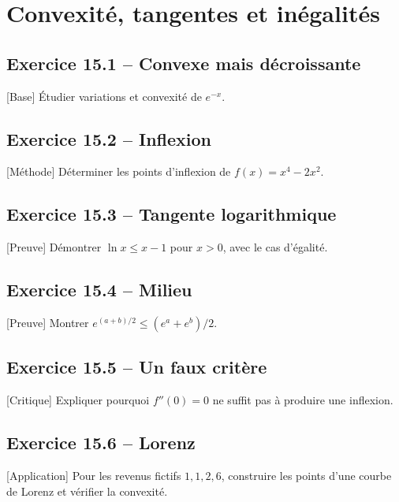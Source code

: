 \chapter{Convexité, tangentes et inégalités}
\section*{Exercice 15.1 -- Convexe mais décroissante}
[Base] Étudier variations et convexité de $e^{-x}$.

\section*{Exercice 15.2 -- Inflexion}
[Méthode] Déterminer les points d'inflexion de $f(x)=x^4-2x^2$.

\section*{Exercice 15.3 -- Tangente logarithmique}
[Preuve] Démontrer $\ln x\le x-1$ pour $x>0$, avec le cas d'égalité.

\section*{Exercice 15.4 -- Milieu}
[Preuve] Montrer $e^{(a+b)/2}\le(e^a+e^b)/2$.

\section*{Exercice 15.5 -- Un faux critère}
[Critique] Expliquer pourquoi $f''(0)=0$ ne suffit pas à produire une inflexion.

\section*{Exercice 15.6 -- Lorenz}
[Application] Pour les revenus fictifs $1,1,2,6$, construire les points d'une courbe de Lorenz et vérifier la convexité.
